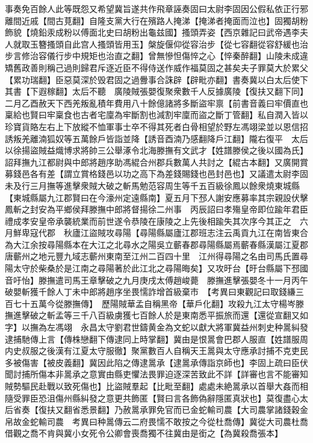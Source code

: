 事奏免百餘人此等既怨又希望冀旨遂共作飛章誣奏固曰太尉李固因公假私依正行邪離間近戚【間古莧翻】自隆支黨大行在殯路人掩涕【掩涕者掩面而泣也】固獨胡粉飾貌【燒鉛汞成粉以傅面北史曰胡粉出龜兹國】搔頭弄姿【西京雜記曰武帝遇李夫人就取玉簪搔頭自此宫人搔頭皆用玉】槃旋偃仰從容治步【從七容翻從容舒緩也治步言修治容儀行步中規矩也治直之翻】曾無慘怛傷悴之心【悴秦醉翻】山陵未成違矯舊政善則稱己過則歸君斥逐近臣不得侍送作威作福莫固之甚矣夫子罪莫大於累父【累功瑞翻】臣惡莫深於毁君固之過釁事合誅辟【辟毗亦翻】書奏冀以白太后使下其書【下遐稼翻】太后不聽　廣陵賊張嬰復聚衆數千人反據廣陵【復扶又翻下同】　二月乙酉赦天下西羌叛亂積年費用八十餘億諸將多斷盜牢禀【前書音義曰牢價直也稟給也賢曰牢稟食也古者宅廩為牢斷割也減割牢廩而盜之斷丁管翻】私自潤入皆以珍寶貨賂左右上下放縱不恤軍事士卒不得其死者白骨相望於野左馮翊梁並以恩信招誘叛羌離湳狐奴等五萬餘戶皆詣並降【誘音酉湳乃感翻降戶江翻】隴右復平　太后以徐揚盜賊益熾博求將帥三公舉涿令北海滕撫有文武才【姓譜滕侯之後以國為氏】詔拜撫九江都尉與中郎將趙序助馮緄合州郡兵數萬人共討之【緄古本翻】又廣開賞募錢邑各有差【謂立賞格錢邑以功之高下為差錢賜錢也邑封邑也】又議遣太尉李固未及行三月撫等進擊衆賊大破之斬馬勉范容周生等千五百級徐鳳以餘衆燒東城縣【東城縣屬九江郡賢曰在今濠州定遠縣南】夏五月下邳人謝安應募率其宗親設伏擊鳳斬之封安為平鄉侯拜滕撫中郎將督揚徐二州事　丙辰詔曰孝殤皇帝即位踰年君臣禮成孝安皇帝承襲統業而前世遂令恭陵在康陵之上先後相踰失其次序今其正之　六月鮮卑寇代郡　秋廬江盜賊攻尋陽【尋陽縣屬廬江郡班志注云禹貢九江在南皆東合為大江余按尋陽縣本在大江之北尋水之陽吳立蘄春郡尋陽縣屬焉蘄春縣漢屬江夏郡唐蘄州之地元豐九域志蘄州東南至江州二百四十里　江州得尋陽之名由司馬氏置尋陽太守於柴桑於是江南之尋陽著於此江北之尋陽晦矣】又攻旴台【旴台縣屬下邳國音吁怡】滕撫遣司馬王章擊破之九月庚戌太傅趙峻薨　滕撫進擊張嬰冬十一月丙午破嬰斬獲千餘人丁未中郎將趙序坐畏懦詐增首級棄市　【考異曰東觀記曰取錢縑三百七十五萬今從滕撫傳】　歷陽賊華孟自稱黑帝【華戶化翻】攻殺九江太守楊岑滕撫進擊破之斬孟等三千八百級虜獲七百餘人於是東南悉平振旅而還【還從宣翻又如字】以撫為左馮翊　永昌太守劉君世鑄黄金為文蛇以獻大將軍冀益州刺史种暠糾發逮捕馳傳上言【傳株戀翻下傳逮同上時掌翻】冀由是恨暠會巴郡人服直【姓譜服周内史叔服之後漢有江夏太守服徹】聚黨數百人自稱天王暠與太守應承討捕不克吏民多被傷害【被皮義翻】冀因此陷之傳逮暠承【逮暠承傳詣京師也】李固上疏曰臣伏聞討捕所傷本非暠承之意實由縣吏懼法畏罪迫逐深苦致此不詳【詳審也言不能審知賊勢驅民赴戰以致死傷也】比盜賊羣起【比毗至翻】處處未絶暠承以首舉大姦而相隨受罪臣恐沮傷州縣糾發之意更共飾匿【賢曰言各飾偽辭隱匿真狀也】莫復盡心太后省奏【復扶又翻省悉景翻】乃赦暠承罪免官而已金蛇輸司農【大司農掌諸錢穀金帛故金蛇輸司農　考異曰种暠傳云二府畏懦不敢按之今從杜喬傳】冀從大司農杜喬借觀之喬不肯與冀小女死令公卿會喪喬獨不往冀由是銜之【為冀殺喬張本】

